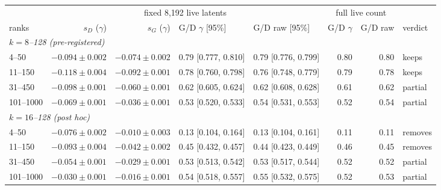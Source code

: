 \begin{tabular}{l rr ll rr l}
\toprule
 & \multicolumn{4}{c}{fixed 8,192 live latents} & \multicolumn{2}{c}{full live count} & \\
\cmidrule(lr){2-5}\cmidrule(lr){6-7}
ranks & $s_D$ ($\gamma$) & $s_G$ ($\gamma$) & G/D $\gamma$ [95\%] & G/D raw [95\%] & G/D $\gamma$ & G/D raw & verdict \\
\midrule
\multicolumn{8}{l}{\emph{$k=8$--128 (pre-registered)}} \\
4--50 & $-0.094 \pm 0.002$ & $-0.074 \pm 0.002$ & 0.79 [0.777, 0.810] & 0.79 [0.776, 0.799] & 0.80 & 0.80 & keeps \\
11--150 & $-0.118 \pm 0.004$ & $-0.092 \pm 0.001$ & 0.78 [0.760, 0.798] & 0.76 [0.748, 0.779] & 0.79 & 0.78 & keeps \\
31--450 & $-0.098 \pm 0.001$ & $-0.060 \pm 0.001$ & 0.62 [0.605, 0.624] & 0.62 [0.608, 0.628] & 0.61 & 0.62 & partial \\
101--1000 & $-0.069 \pm 0.001$ & $-0.036 \pm 0.001$ & 0.53 [0.520, 0.533] & 0.54 [0.531, 0.553] & 0.52 & 0.54 & partial \\
\multicolumn{8}{l}{\emph{$k=16$--128 (post hoc)}} \\
4--50 & $-0.076 \pm 0.002$ & $-0.010 \pm 0.003$ & 0.13 [0.104, 0.164] & 0.13 [0.104, 0.161] & 0.11 & 0.11 & removes \\
11--150 & $-0.093 \pm 0.004$ & $-0.042 \pm 0.002$ & 0.45 [0.432, 0.457] & 0.44 [0.423, 0.449] & 0.46 & 0.45 & removes \\
31--450 & $-0.054 \pm 0.001$ & $-0.029 \pm 0.001$ & 0.53 [0.513, 0.542] & 0.53 [0.517, 0.544] & 0.52 & 0.52 & partial \\
101--1000 & $-0.030 \pm 0.001$ & $-0.016 \pm 0.001$ & 0.54 [0.518, 0.557] & 0.55 [0.532, 0.575] & 0.52 & 0.53 & partial \\
\bottomrule
\end{tabular}

